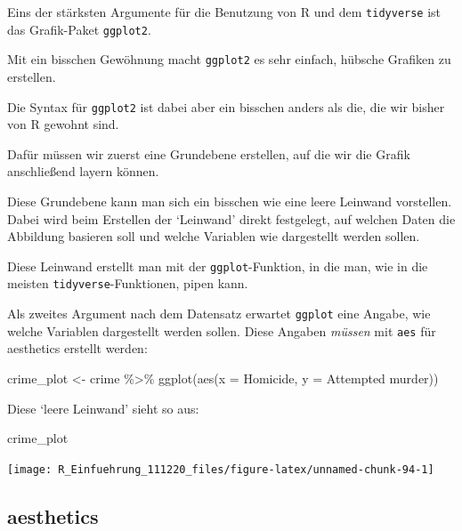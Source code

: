 \documentclass[
]{book}
\newenvironment{Shaded}{\begin{snugshade}}{\end{snugshade}}
\newcommand{\AttributeTok}[1]{\textcolor[rgb]{0.77,0.63,0.00}{#1}}
\newcommand{\FunctionTok}[1]{\textcolor[rgb]{0.00,0.00,0.00}{#1}}
\newcommand{\NormalTok}[1]{#1}
\newcommand{\OtherTok}[1]{\textcolor[rgb]{0.56,0.35,0.01}{#1}}
\newcommand{\SpecialCharTok}[1]{\textcolor[rgb]{0.00,0.00,0.00}{#1}}
\newcommand{\StringTok}[1]{\textcolor[rgb]{0.31,0.60,0.02}{#1}}
\begin{document}
Eins der stärksten Argumente für die Benutzung von R und dem \texttt{tidyverse} ist das Grafik-Paket \texttt{ggplot2}.

Mit ein bisschen Gewöhnung macht \texttt{ggplot2} es sehr einfach, hübsche Grafiken zu erstellen.

Die Syntax für \texttt{ggplot2} ist dabei aber ein bisschen anders als die, die wir bisher von R gewohnt sind.

Dafür müssen wir zuerst eine Grundebene erstellen, auf die wir die Grafik anschließend layern können.

Diese Grundebene kann man sich ein bisschen wie eine leere Leinwand vorstellen.
Dabei wird beim Erstellen der `Leinwand' direkt festgelegt, auf welchen Daten die Abbildung basieren soll und welche Variablen wie dargestellt werden sollen.

Diese Leinwand erstellt man mit der \texttt{ggplot}-Funktion, in die man, wie in die meisten \texttt{tidyverse}-Funktionen, pipen kann.

Als zweites Argument nach dem Datensatz erwartet \texttt{ggplot} eine Angabe, wie welche Variablen dargestellt werden sollen. Diese Angaben \emph{müssen} mit \texttt{aes} für aesthetics erstellt werden:

\begin{Shaded}
\begin{Highlighting}[]
\NormalTok{crime\_plot }\OtherTok{\textless{}{-}}\NormalTok{ crime }\SpecialCharTok{\%\textgreater{}\%} 
  \FunctionTok{ggplot}\NormalTok{(}\FunctionTok{aes}\NormalTok{(}\AttributeTok{x =}\NormalTok{ Homicide, }\AttributeTok{y =} \StringTok{\textasciigrave{}}\AttributeTok{Attempted murder}\StringTok{\textasciigrave{}}\NormalTok{))}
\end{Highlighting}
\end{Shaded}

Diese `leere Leinwand' sieht so aus:

\begin{Shaded}
\begin{Highlighting}[]
\NormalTok{crime\_plot}
\end{Highlighting}
\end{Shaded}

\begin{center}\texttt{[image: R\_Einfuehrung\_111220\_files/figure-latex/unnamed-chunk-94-1]} \end{center}

\hypertarget{aesthetics}{%
\subsection{aesthetics}\label{aesthetics}}
\end{document}
